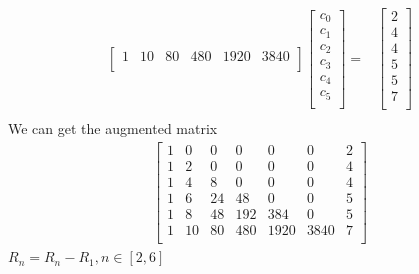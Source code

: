 \documentclass{article}
\begin{document}
{\begin{equation*}
\begin{split}
\begin{bmatrix}
                            1&10&80&480&1920&3840\\
                        \end{bmatrix}
                        \begin{bmatrix}
                            c_0\\c_1\\c_2\\c_3\\c_4\\c_5\\
                        \end{bmatrix}=&
                        \begin{bmatrix}
                            2\\
                            4\\
                            4\\
                            5\\
                            5\\
                            7\\    
                        \end{bmatrix}\\
                    \end{split}
                \end{equation*}
                We can get the augmented matrix
                \begin{equation*}
                    \begin{split}
                        \begin{bmatrix}
                            1&0&0&0&0&0&2\\
                            1&2&0&0&0&0&4\\
                            1&4&8&0&0&0&4\\
                            1&6&24&48&0&0&5\\
                            1&8&48&192&384&0&5\\
                            1&10&80&480&1920&3840&7\\
                        \end{bmatrix}
                    \end{split}
                \end{equation*}
                $R_n=R_n-R_1,n\in[2,6]$
                \begin{equation*}
                    \begin{split}

\end{split}
\end{equation*}}
\end{document}
